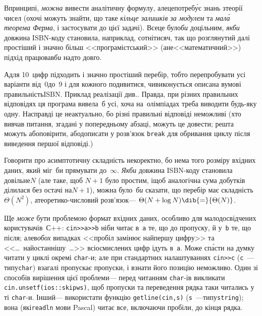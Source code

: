 \Tutorial	В\nolinebreak[3] принципі, \emph{можна} вивести аналітичну формулу, але\nolinebreak[2] це\nolinebreak[1] потреб\'{у}є знань з\nolinebreak[3] теорії чисел (охочі можуть знайти, що таке \emph{кільце залишків за модулем} та \emph{мал\'{а} теорема Ферма}, і застосувати до цієї задачі). Все\nolinebreak[3] це було\nolinebreak[3] \emph{би} доцільним, \emph{якби} довжина ISBN-коду становила, наприклад, \mbox{сотні}\nolinebreak[1] \mbox{тисяч}, так що розглянутий далі простіший і значно більш <<програмістський>> (а\nolinebreak[3] не\nolinebreak[3] <<математичний>>) підхід працював\nolinebreak[3] \emph{би} надто довго.

А\nolinebreak[3] для 10~цифр підходить і значно простіший перебір, тобто перепробувати усі варіанти від~0\nolinebreak[1] до~9 і для кожного подивитися, чи\nolinebreak[3] виконується описана в\nolinebreak[3] умові правильність\nolinebreak[3] ISBN. Приклад реалізації див.\nolinebreak[1] . Правда, при різних правильних відповідях ця програма вивела~б усі, хоча на~олімпіадах треба виводити будь-яку одну. Насправді це неактуально, бо різні правильні відповіді неможливі (хто вивчав питання, згадані у попередньому абзаці, можуть це довести; решта можуть або\nolinebreak[3] повірити, або\nolinebreak[3] дописати у розв'язок \verb"break" для обривання циклу після виведення першої відповіді.)

Говорити про асимптотичну складність некоректно, бо нема того розміру вхідних даних, який міг~би прямувати до~$\infty$. \emph{Якби} довжина ISBN-коду становила довільне\nolinebreak[3] $N$ (але таке, щоб $N{+}1$ було простим, і\nolinebreak[3] щоб аналогічна сума добутків ділилася без остачі на\nolinebreak[2] $N{+}1$), можна було~\emph{би} сказати, що перебір має складність\nolinebreak[3] $\Theta(N^2)$, а\nolinebreak[3] теоретико-числовий розв'язок\nolinebreak[3] --- ${\Theta(N+\log{}N)}\dib{{=}}{\Theta(N)}$.

\myhrulefill

Ще \emph{може} бути проблемою формат вхідних даних, особливо для мало\-досвід\-чених користувачів~\mbox{С++}: \verb"cin>>a>>b" ніби читає в~\verb"a" те, що до пропуску, й у~\verb"b" те, що після; але\nolinebreak[3] в\nolinebreak[2] \emph{обох} випадках <<пробіл замінює найпершу цифру>> та <<\dots~най\-остан\-нішу~\dots>> всі\nolinebreak[1] осмислених цифр ідуть в~\verb"a". Може сп\'{а}сти на думку читати у циклі окремі \mbox{\verb"char"-и}; але при стандартних налаштуваннях \verb"cin>>c" (\verb"c"~---\nolinebreak[1] \mbox{типу}\nolinebreak[2] \verb"char") взагалі пропускає пропуски, і взнати його позицію неможливо. Один зі способів вирішення цієї проблеми\nolinebreak[3] --- перед читанням \mbox{\verb"char"-ів} викликати %
\verb"cin.unsetf(ios::skipws)", щоб пропуски та переведення рядка таки читались у ті \mbox{\verb"char"-и}. Інший\nolinebreak[3] --- використати функцію \verb"getline(cin,s)" (\verb"s"~---\nolinebreak[1] типу\nolinebreak[1] \verb"string"); вона (як\nolinebreak[2] і\nolinebreak[2] \verb"readln" мови Pascal) читає все, включаючи пробіли, до кінця рядка.

